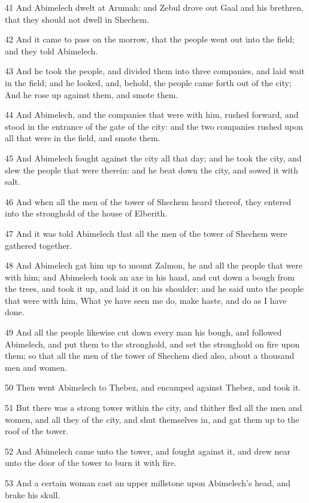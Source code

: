 \par 41 And Abimelech dwelt at Arumah: and Zebul drove out Gaal and his brethren, that they should not dwell in Shechem.
\par 42 And it came to pass on the morrow, that the people went out into the field; and they told Abimelech.
\par 43 And he took the people, and divided them into three companies, and laid wait in the field; and he looked, and, behold, the people came forth out of the city; And he rose up against them, and smote them.
\par 44 And Abimelech, and the companies that were with him, rushed forward, and stood in the entrance of the gate of the city: and the two companies rushed upon all that were in the field, and smote them.
\par 45 And Abimelech fought against the city all that day; and he took the city, and slew the people that were therein: and he beat down the city, and sowed it with salt.
\par 46 And when all the men of the tower of Shechem heard thereof, they entered into the stronghold of the house of Elberith.
\par 47 And it was told Abimelech that all the men of the tower of Shechem were gathered together.
\par 48 And Abimelech gat him up to mount Zalmon, he and all the people that were with him; and Abimelech took an axe in his hand, and cut down a bough from the trees, and took it up, and laid it on his shoulder: and he said unto the people that were with him, What ye have seen me do, make haste, and do as I have done.
\par 49 And all the people likewise cut down every man his bough, and followed Abimelech, and put them to the stronghold, and set the stronghold on fire upon them; so that all the men of the tower of Shechem died also, about a thousand men and women.
\par 50 Then went Abimelech to Thebez, and encamped against Thebez, and took it.
\par 51 But there was a strong tower within the city, and thither fled all the men and women, and all they of the city, and shut themselves in, and gat them up to the roof of the tower.
\par 52 And Abimelech came unto the tower, and fought against it, and drew near unto the door of the tower to burn it with fire.
\par 53 And a certain woman cast an upper millstone upon Abimelech's head, and brake his skull.
